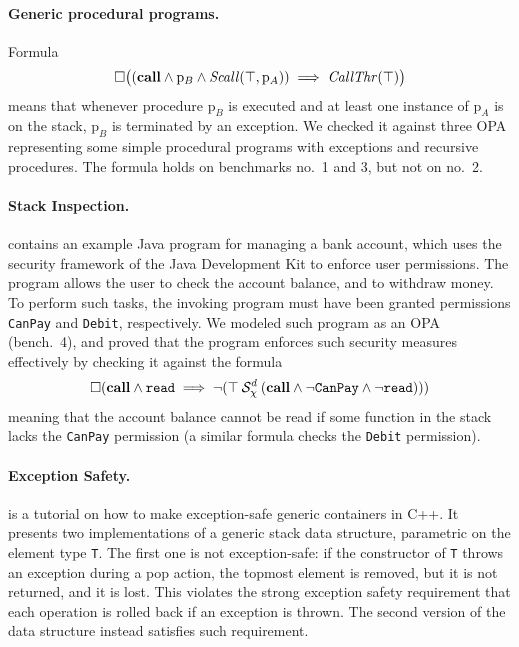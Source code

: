 \documentclass{article}
\begin{document}
\paragraph{Generic procedural programs.}
Formula
\[
  \square \big((\mathbf{call} \land \mathrm{p}_B \land
    \mathit{Scall}(\top, \mathrm{p}_A))
    \implies \mathit{CallThr}(\top) \big)
\]
means that whenever procedure $\mathrm{p}_B$ is executed and at least
one instance of $\mathrm{p}_A$ is on the stack, $\mathrm{p}_B$ is
terminated by an exception.  We checked it against three OPA
representing some simple procedural programs with exceptions and
recursive procedures.  The formula holds on benchmarks no.\ 1 and 3,
but not on no.\ 2.

\paragraph{Stack Inspection.}
\cite{JensenLT99} contains an example Java program for managing a bank
account, which uses the security framework of the Java Development Kit
to enforce user permissions. The program allows the user to check the
account balance, and to withdraw money. To perform such tasks, the
invoking program must have been granted permissions \texttt{CanPay}
and \texttt{Debit}, respectively.  We modeled such program as an OPA
(bench.\ 4), and proved that the program enforces such security
measures effectively by checking it against the formula
\[
\square (\mathbf{call} \land \mathtt{read} \implies
  \neg ({\top} \mathbin{\mathcal{S}_\chi^d} {(\mathbf{call} \land
                         \neg \mathtt{CanPay}
                         \land \neg \mathtt{read})}))
\]
meaning that the account balance cannot be read if some function in
the stack lacks the \texttt{CanPay} permission (a similar formula
checks the \texttt{Debit} permission).

\paragraph{Exception Safety.}
\cite{Sutter97} is a tutorial on how to make exception-safe generic
containers in C++. It presents two implementations of a generic stack
data structure, parametric on the element type \texttt{T}. The first
one is not exception-safe: if the constructor of \texttt{T} throws an
exception during a pop action, the topmost element is removed, but it
is not returned, and it is lost.  This violates the strong exception
safety \cite{Abrahams00} requirement that each operation is rolled
back if an exception is thrown. The second version of the data
structure instead satisfies such requirement.
\end{document}
